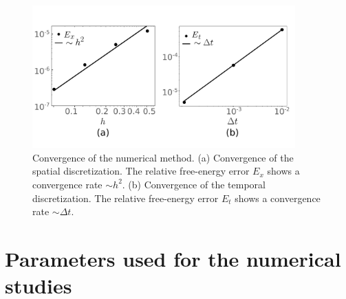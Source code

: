 \documentclass[12pt]{iopart}
\begin{document}
			\begin{figure}[t]
				\centering
				\includegraphics[width=0.9\textwidth]{append.pdf}
				\caption{\label{grid} Convergence of the numerical method. (a) Convergence of the spatial discretization. The relative free-energy error $E_x$  shows a convergence rate $\sim h^{2}$. (b) Convergence of the temporal discretization. The relative free-energy error  $E_t$  shows a convergence rate $\sim \Delta t$.}
			\end{figure}
			
			\section{Parameters used for the numerical studies}
			
\end{document}
